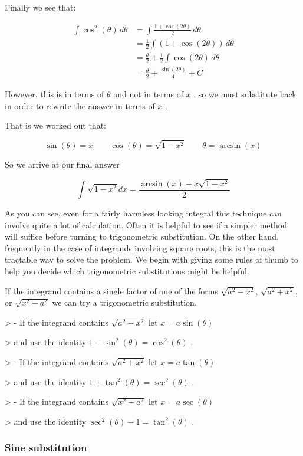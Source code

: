 Finally we see that:


\begin{align}
\int \cos^2(\theta)\,d\theta &= \int \frac{1 + \cos(2\theta)}{2}\,d\theta \\&= \frac{1}{2}\int (1 + \cos(2\theta))\,d\theta \\&= \frac{\theta}{2} + \frac{1}{2}\int \cos(2\theta)\,d\theta \\&= \frac{\theta}{2} + \frac{\sin(2\theta)}{4} + C
\end{align}


However, this is in terms of $\theta$ and not in terms of $x$ , so we must substitute back in order to rewrite the answer in terms of $x$ .


That is we worked out that:


\[
\sin(\theta)=x\qquad\cos(\theta)=\sqrt{1-x^2}\qquad\theta=\arcsin(x)
\]


So we arrive at our final answer


\[
\int\sqrt{1-x^2}dx=\frac{\arcsin(x)+x\sqrt{1-x^2}}{2}
\]


As you can see, even for a fairly harmless looking integral this technique can involve quite a lot of calculation. Often it is helpful to see if a simpler method will suffice before turning to trigonometric substitution. On the other hand, frequently in the case of integrands involving square roots, this is the most tractable way to solve the problem. We begin with giving some rules of thumb to help you decide which trigonometric substitutions might be helpful.


If the integrand contains a single factor of one of the forms $\sqrt{a^2-x^2}$, $\sqrt{a^2+x^2}$, or $\sqrt{x^2-a^2}$ we can try a trigonometric substitution.


> -   If the integrand contains $\sqrt{a^2-x^2}$ let $x=a\sin(\theta)$

>     and use the identity $1-\sin^2(\theta)=\cos^2(\theta)$ .

> -   If the integrand contains $\sqrt{a^2+x^2}$ let $x=a\tan(\theta)$

>     and use the identity $1+\tan^2(\theta)=\sec^2(\theta)$ .

> -   If the integrand contains $\sqrt{x^2-a^2}$ let $x=a\sec(\theta)$

>     and use the identity $\sec^2(\theta)-1=\tan^2(\theta)$ .


\subsubsection{Sine substitution}
\label{sss:sine-8011}


